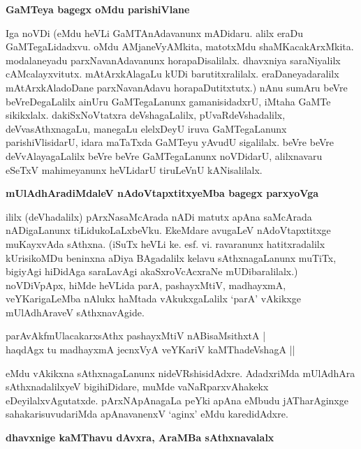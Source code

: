 {\bigskip
\noindent
{\large\bf GaMTeya bagegx oMdu parishiVlane}}\label{page170a}
\medskip

\noindent
Iga noVDi (eMdu heVLi GaMTAnAdavanunx mADidaru. alilx eraDu GaMTegaLidadxvu. oMdu AMjaneVyAMkita, matotxMdu shaMKacakArxMkita. modalaneyadu parxNavanAdavanunx horapaDisalilalx. dhavxniya saraNiyalilx cAMcalayxvitutx. mAtArxkAlagaLu kUDi barutitxralilalx. eraDaneyadaralilx mAtArxkAladoDane parxNavanAdavu horapaDutitxtutx.) nAnu sumAru beVre beVreDegaLalilx ainUru GaMTegaLanunx gamanisidadxrU, iMtaha GaMTe sikikxlalx. dakiSxNoVtatxra deVshagaLalilx, pUvaRdeVshadalilx, deVvasAthxnagaLu, manegaLu elelxDeyU iruva GaMTegaLanunx parishiVlisidarU, idara maTaTxda GaMTeyu yAvudU sigalilalx. beVre beVre deVvAlayagaLalilx beVre beVre GaMTegaLanunx noVDidarU, alilxnavaru eSeTxV mahimeyanunx heVLidarU tiruLeVnU kANisalilalx.

\eject

{\bigskip
\noindent
{\large\bf mUlAdhAradiMdaleV nAdoVtapxtitxyeMba bagegx parxyoVga}}\label{page171}
\medskip

\noindent
ililx (deVhadalilx) pArxNasaMcArada nADi matutx apAna saMcArada nADigaLanunx tiLidukoLaLxbeVku. EkeMdare avugaLeV nAdoVtapxtitxge muKayxvAda sAthxna. (iSuTx heVLi ke. esf. vi. ravaranunx hatitxradalilx kUrisikoMDu beninxna aDiya BAgadalilx kelavu sAthxnagaLanunx muTiTx, bigiyAgi hiDidAga saraLavAgi akaSxroVcAcxraNe mUDibaralilalx.) noVDiVpApx, hiMde heVLida parA, pashayxMtiV, madhayxmA, veYKarigaLeMba nAlukx haMtada vAkukxgaLalilx `parA' vAkikxge mUlAdhAraveV sAthxnavAgide.

\begin{shloka}
parAvAkfmUlacakarxsAthx pashayxMtiV nABisaMsithxtA |\\\label{171}
haqdAgx tu madhayxmA jecnxVyA veYKariV kaMThadeVshagA ||
\end{shloka}

\noindent
eMdu vAkikxna sAthxnagaLanunx nideVRshisidAdxre. AdadxriMda mUlAdhAra sAthxnadalilxyeV bigihiDidare, muMde vaNaRparxvAhakekx eDeyilalxvAgutatxde. pArxNApAnagaLa peYki apAna eMbudu jATharAginxge sahakarisuvudariMda apAnavanenxV `aginx' eMdu karedidAdxre.

{\bigskip
\noindent
{\large\bf dhavxnige kaMThavu dAvxra, AraMBa sAthxnavalalx}}\label{page171a}
\medskip

